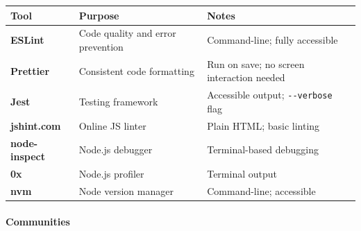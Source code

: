 \documentclass[
  justified,
  openright,
]{tufte-book}
\let\subsubsection\paragraph
\let\paragraph\paragraph
\let\subsubsection\paragraph
\let\paragraph\paragraph
\begin{document}
{\def\LTcaptype{none} %
\begin{longtable}[]{@{}
  >{\raggedright\arraybackslash}p{}
  >{\raggedright\arraybackslash}p{}
  >{\raggedright\arraybackslash}p{}@{}}
\toprule\noalign{}
\begin{minipage}[b]{\linewidth}\raggedright
Tool
\end{minipage} & \begin{minipage}[b]{\linewidth}\raggedright
Purpose
\end{minipage} & \begin{minipage}[b]{\linewidth}\raggedright
Notes
\end{minipage} \\
\midrule\noalign{}
\endhead
\bottomrule\noalign{}
\endlastfoot
\textbf{ESLint} & Code quality and error prevention & Command-line;
fully accessible \\
\textbf{Prettier} & Consistent code formatting & Run on save; no screen
interaction needed \\
\textbf{Jest} & Testing framework & Accessible output;
\texttt{-\/-verbose} flag \\
\textbf{jshint.com} & Online JS linter & Plain HTML; basic linting \\
\textbf{node-inspect} & Node.js debugger & Terminal-based debugging \\
\textbf{0x} & Node.js profiler & Terminal output \\
\textbf{nvm} & Node version manager & Command-line; accessible \\
\end{longtable}
}

\subsubsection{Communities}\label{communities}
\end{document}
